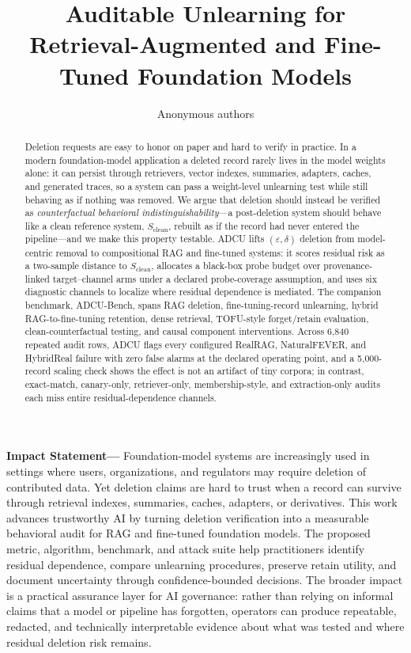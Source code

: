 \documentclass[10pt,journal,compsoc]{IEEEtran}
\newcommand{\method}{ADCU}
\newcommand{\bench}{ADCU-Bench}
\begin{document}
\title{Auditable Unlearning for Retrieval-Augmented and Fine-Tuned Foundation Models}

\author{Anonymous authors}


\maketitle

\begin{abstract}
Deletion requests are easy to honor on paper and hard to verify in practice. In a modern foundation-model application a deleted record rarely lives in the model weights alone: it can persist through retrievers, vector indexes, summaries, adapters, caches, and generated traces, so a system can pass a weight-level unlearning test while still behaving as if nothing was removed. We argue that deletion should instead be verified as \emph{counterfactual behavioral indistinguishability}---a post-deletion system should behave like a clean reference system, $S_{\mathrm{clean}}$, rebuilt as if the record had never entered the pipeline---and we make this property testable. \method{} lifts $(\varepsilon,\delta)$ deletion from model-centric removal to compositional RAG and fine-tuned systems: it scores residual risk as a two-sample distance to $S_{\mathrm{clean}}$, allocates a black-box probe budget over provenance-linked target--channel arms under a declared probe-coverage assumption, and uses six diagnostic channels to localize where residual dependence is mediated. The companion benchmark, \bench{}, spans RAG deletion, fine-tuning-record unlearning, hybrid RAG-to-fine-tuning retention, dense retrieval, TOFU-style forget/retain evaluation, clean-counterfactual testing, and causal component interventions. Across 6{,}840 repeated audit rows, \method{} flags every configured RealRAG, NaturalFEVER, and HybridReal failure with zero false alarms at the declared operating point, and a 5{,}000-record scaling check shows the effect is not an artifact of tiny corpora; in contrast, exact-match, canary-only, retriever-only, membership-style, and extraction-only audits each miss entire residual-dependence channels.
\end{abstract}

\noindent\textbf{Impact Statement---}
Foundation-model systems are increasingly used in settings where users, organizations, and regulators may require deletion of contributed data. Yet deletion claims are hard to trust when a record can survive through retrieval indexes, summaries, caches, adapters, or derivatives. This work advances trustworthy AI by turning deletion verification into a measurable behavioral audit for RAG and fine-tuned foundation models. The proposed metric, algorithm, benchmark, and attack suite help practitioners identify residual dependence, compare unlearning procedures, preserve retain utility, and document uncertainty through confidence-bounded decisions. The broader impact is a practical assurance layer for AI governance: rather than relying on informal claims that a model or pipeline has forgotten, operators can produce repeatable, redacted, and technically interpretable evidence about what was tested and where residual deletion risk remains.
\end{document}
